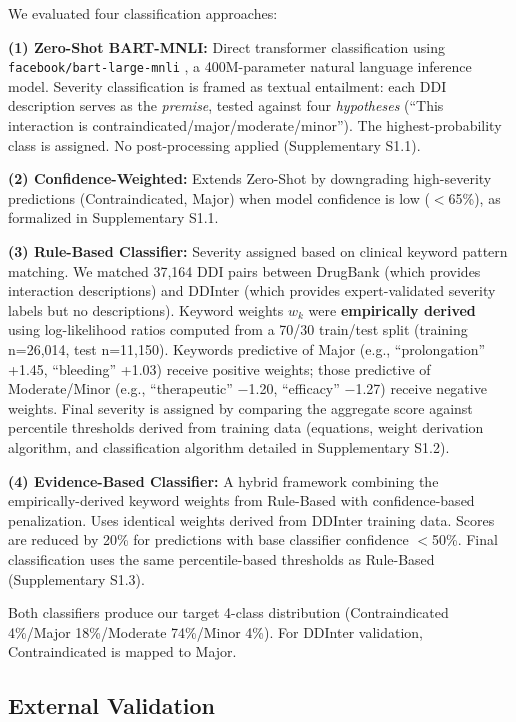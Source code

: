 \documentclass[11pt,a4paper]{article}
\begin{document}
We evaluated four classification approaches:

\textbf{(1) Zero-Shot BART-MNLI:} Direct transformer classification using \texttt{facebook/bart-large-mnli} \cite{lewis2020bart}, a 400M-parameter natural language inference model. Severity classification is framed as textual entailment: each DDI description serves as the \textit{premise}, tested against four \textit{hypotheses} (``This interaction is contraindicated/major/moderate/minor''). The highest-probability class is assigned. No post-processing applied (Supplementary S1.1).

\textbf{(2) Confidence-Weighted:} Extends Zero-Shot by downgrading high-severity predictions (Contraindicated, Major) when model confidence is low ($<$65\%), as formalized in Supplementary S1.1.

\textbf{(3) Rule-Based Classifier:} Severity assigned based on clinical keyword pattern matching. We matched 37,164 DDI pairs between DrugBank (which provides interaction descriptions) and DDInter (which provides expert-validated severity labels but no descriptions). Keyword weights $w_k$ were \textbf{empirically derived} using log-likelihood ratios computed from a 70/30 train/test split (training n=26,014, test n=11,150). Keywords predictive of Major (e.g., ``prolongation'' +1.45, ``bleeding'' +1.03) receive positive weights; those predictive of Moderate/Minor (e.g., ``therapeutic'' $-$1.20, ``efficacy'' $-$1.27) receive negative weights. Final severity is assigned by comparing the aggregate score against percentile thresholds derived from training data (equations, weight derivation algorithm, and classification algorithm detailed in Supplementary S1.2).

\textbf{(4) Evidence-Based Classifier:} A hybrid framework combining the empirically-derived keyword weights from Rule-Based with confidence-based penalization. Uses identical weights derived from DDInter training data. Scores are reduced by 20\% for predictions with base classifier confidence $<$50\%. Final classification uses the same percentile-based thresholds as Rule-Based (Supplementary S1.3).

Both classifiers produce our target 4-class distribution (Contraindicated 4\%/Major 18\%/Moderate 74\%/Minor 4\%). For DDInter validation, Contraindicated is mapped to Major.

\subsection*{External Validation}
\end{document}

